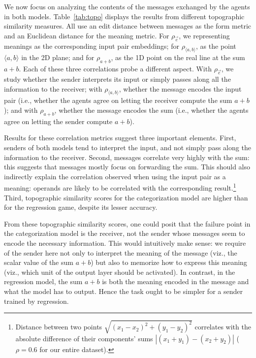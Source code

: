\documentclass[twocolumn]{article}
\begin{document}
We now focus on analyzing the contents of the messages exchanged by the agents in both models.
Table~\ref{tab:topo} displays the results from different topographic similarity measures. %
All use an edit distance between messages as the form metric and an Euclidean distance for the meaning metric.
For $\rho_{\vec{e}}$, we representing meanings as the corresponding input pair embeddings; for $\rho_{\langle a,b \rangle}$, as the point $\langle a,b \rangle$ in the 2D plane; and for $\rho_{a+b}$, as the 1D point on the real line at the sum $a+b$.
Each of these three correlations probe a different aspect.
With $\rho_{\vec{e}}$, we study whether the sender interprets its input or simply passes along all the information to the receiver; with $\rho_{\langle a,b \rangle}$, whether the message encodes the input pair (i.e., whether the agents agree on letting the receiver compute the sum $a+b$); and with $\rho_{a+b}$, whether the message encodes the sum (i.e., whether the agents agree on letting the sender compute $a+b$).

Results for these correlation metrics suggest three important elements.
First, senders of both models tend to interpret the input, and not simply pass along the information to the receiver.
Second, messages correlate very highly with the sum: this suggests that messages mostly focus on forwarding the sum.
This should also indirectly explain the correlation observed when using the input pair as a meaning: operands are likely to be correlated with the corresponding result.\footnote{
    Distance between two points $\sqrt{(x_1 - x_2)^2+(y_1- y_2 )^2}$ correlates with the absolute difference of their components' sums $|(x_1 + y_1) - (x_2 + y_2)|$ ($\rho=0.6$ for our entire dataset).
}
Third, topographic similarity scores for the categorization model are higher than for the regression game, despite its lesser accuracy. %

From these topographic similarity scores, one could posit that the failure point in the categorization model is the receiver, not the sender whose messages seem to encode the necessary information.
This would intuitively make sense: we require of the sender here not only to interpret the meaning of the message (viz., the scalar value of the sum $a+b$) but also to memorize how to express this meaning (viz., which unit of the output layer should be activated).
In contrast, in the regression model, the sum $a+b$ is both the meaning encoded in the message and what the model has to output.
Hence the task ought to be simpler for a sender trained by regression. 
\end{document}
